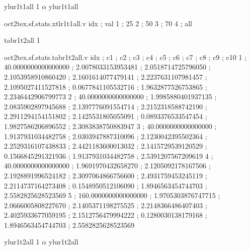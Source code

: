 \expandafter\def\csname oct2tex.sf.stats.ylur1t1all.t\endcsname{ylur1t1all}
\expandafter\def\csname oct2tex.sf.stats.ylur1t1all.u\endcsname{1}
\expandafter\def\csname oct2tex.sf.stats.ylur1t1all.v\endcsname{$\alpha$}
\expandafter\def\csname oct2tex.sf.stats.xtlr1t1all.t\endcsname{ylur1t1all}
\begin{filecontents}[overwrite]{oct2tex.sf.stats.xtlr1t1all.v}
idx ; val
1 ; 25
2 ; 50
3 ; 70
4 ; all
\end{filecontents}
\expandafter\def\csname oct2tex.sf.stats.tabr1t2all.t\endcsname{tabr1t2all}
\expandafter\def\csname oct2tex.sf.stats.tabr1t2all.u\endcsname{1}
\begin{filecontents}[overwrite]{oct2tex.sf.stats.tabr1t2all.v}
idx ; c1 ; c2 ; c3 ; c4 ; c5 ; c6 ; c7 ; c8 ; c9 ; c10
1 ; 40.0000000000000000 ; 2.0078033153953481 ; 2.0518714725796050 ; 2.1053958910860420 ; 2.1601614077479141 ; 2.2237631107981457 ; 2.1095027411527818 ; 0.0677841105532716 ; 1.9632877526753865 ; 2.2346442906799773
2 ; 40.0000000000000000 ; 1.9985880401937135 ; 2.0835902897945688 ; 2.1397776091554714 ; 2.2152318588742190 ; 2.2911294154151802 ; 2.1425531805055091 ; 0.0893376533547454 ; 1.9827586206896552 ; 2.3083838750883947
3 ; 40.0000000000000000 ; 1.9137931034482758 ; 2.0303947887310096 ; 2.1230042395502364 ; 2.2529316107438833 ; 2.4421183600013032 ; 2.1415729539120529 ; 0.1566845291321936 ; 1.9137931034482758 ; 2.5391207567209619
4 ; 40.0000000000000000 ; 1.9691970432658270 ; 2.1205092178167506 ; 2.1928891996524182 ; 2.3097064866756600 ; 2.4931759453245119 ; 2.2114737164273408 ; 0.1548950512106090 ; 1.8946563454744703 ; 2.5582825628523569
5 ; 160.0000000000000000 ; 1.9705303876747715 ; 2.0666005808227670 ; 2.1405371198275525 ; 2.2148366486407403 ; 2.4025933677059195 ; 2.1512756479994222 ; 0.1280030138179168 ; 1.8946563454744703 ; 2.5582825628523569
\end{filecontents}
\expandafter\def\csname oct2tex.sf.stats.ylur1t2all.t\endcsname{ylur1t2all}
\expandafter\def\csname oct2tex.sf.stats.ylur1t2all.u\endcsname{1}
\expandafter\def\csname oct2tex.sf.stats.ylur1t2all.v\endcsname{$\alpha$}
\expandafter\def\csname oct2tex.sf.stats.xtlr1t2all.t\endcsname{ylur1t2all}
